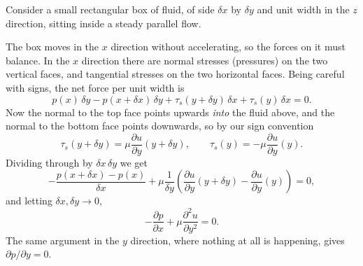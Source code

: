 \documentclass[a4paper]{scrartcl}
\newcommand{\pd}[2]{\frac{\partial #1}{\partial #2}}
\newcommand{\pdd}[2]{\frac{\partial^2 #1}{\partial #2^2}}
\begin{document}
Consider a small rectangular box of fluid, of side $\delta x$ by $\delta y$ and unit width in the $z$ direction, sitting inside a steady parallel flow.

\begin{center}
\end{center}

The box moves in the $x$ direction without accelerating, so the forces on it must balance. In the $x$ direction there are normal stresses (pressures) on the two vertical faces, and tangential stresses on the two horizontal faces. Being careful with signs, the net force per unit width is
$$
p(x)\,\delta y - p(x + \delta x)\, \delta y + \tau_s(y + \delta y)\,\delta x + \tau_s(y) \, \delta x = 0.
$$
Now the normal to the top face points upwards \emph{into} the fluid above, and the normal to the bottom face points downwards, so by our sign convention
$$
\tau_s(y + \delta y) = \mu \pd{u}{y}(y + \delta y), \qquad \tau_s(y) = -\mu \pd{u}{y}(y).
$$
Dividing through by $\delta x \, \delta y$ we get
$$
-\frac{p(x + \delta x) - p(x)}{\delta x} + \mu \frac{1}{\delta y} \left( \pd{u}{y}(y + \delta y) - \pd{u}{y}(y)\right) = 0,
$$
and letting $\delta x, \delta y \to 0$,
$$
- \pd{p}{x} + \mu \pdd{u}{y} = 0.
$$
The same argument in the $y$ direction, where nothing at all is happening, gives $\partial p / \partial y = 0$.
\end{document}
